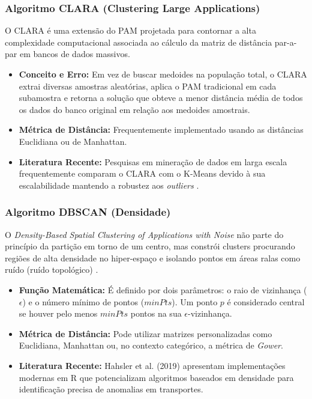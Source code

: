 \documentclass[12pt]{article}
\begin{document}
\subsubsection{Algoritmo CLARA (Clustering Large Applications)}
O CLARA é uma extensão do PAM projetada para contornar a alta complexidade computacional associada ao cálculo da matriz de distância par-a-par em bancos de dados massivos.
\begin{itemize}
    \item \textbf{Conceito e Erro:} Em vez de buscar medoides na população total, o CLARA extrai diversas amostras aleatórias, aplica o PAM tradicional em cada subamostra e retorna a solução que obteve a menor distância média de todos os dados do banco original em relação aos medoides amostrais.
    \item \textbf{Métrica de Distância:} Frequentemente implementado usando as distâncias Euclidiana ou de Manhattan.
    \item \textbf{Literatura Recente:} Pesquisas em mineração de dados em larga escala frequentemente comparam o CLARA com o K-Means devido à sua escalabilidade mantendo a robustez aos \textit{outliers} \cite{schubert2021clara}.
\end{itemize}

\subsubsection{Algoritmo DBSCAN (Densidade)}
O \textit{Density-Based Spatial Clustering of Applications with Noise} não parte do princípio da partição em torno de um centro, mas constrói clusters procurando regiões de alta densidade no hiper-espaço e isolando pontos em áreas ralas como ruído (ruído topológico) \cite{ester1996density}.
\begin{itemize}
    \item \textbf{Função Matemática:} É definido por dois parâmetros: o raio de vizinhança ($\epsilon$) e o número mínimo de pontos ($\textit{minPts}$). Um ponto $p$ é considerado central se houver pelo menos $\textit{minPts}$ pontos na sua $\epsilon$-vizinhança.
    \item \textbf{Métrica de Distância:} Pode utilizar matrizes personalizadas como Euclidiana, Manhattan ou, no contexto categórico, a métrica de \textit{Gower}.
    \item \textbf{Literatura Recente:} Hahsler et al. (2019) \cite{hahsler2019dbscan} apresentam implementações modernas em R que potencializam algoritmos baseados em densidade para identificação precisa de anomalias em transportes.
\end{itemize}
\end{document}
